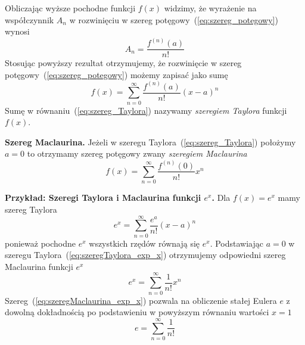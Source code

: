 \documentclass[12pt]{article}
\begin{document}
Obliczając wyższe pochodne funkcji $f(x)$ widzimy, że wyrażenie na
współczynnik $A_{n}$ w rozwinięciu w szereg potęgowy~(\ref{eq:szereg_potegowy})
wynosi
\begin{equation}
A_{n} = \frac{f^{(n)}(a)}{n!}
\end{equation}
Stosując powyższy rezultat otrzymujemy, że 
rozwinięcie w szereg potęgowy~(\ref{eq:szereg_potegowy})
możemy zapisać jako sumę
\begin{equation}
\label{eq:szereg_Taylora}
f(x) 
=
\sum_{n=0}^{\infty} \frac{f^{(n)}(a)}{n!} (x-a)^{n}
\end{equation}
Sumę w równaniu~(\ref{eq:szereg_Taylora}) nazywamy {\em szeregiem Taylora\/} funkcji $f(x)$\@.



{\bf Szereg Maclaurina.\/} Jeżeli w szeregu Taylora~(\ref{eq:szereg_Taylora}) położymy $a = 0$ to otrzymamy 
szereg potęgowy zwany {\em szeregiem Maclaurina\/}
\begin{equation}
\label{eq:szereg_Maclaurina}
f(x) 
=
\sum_{n=0}^{\infty} \frac{f^{(n)}(0)}{n!} x^{n}
\end{equation}


{\bf Przykład: Szeregi Taylora i Maclaurina funkcji $e^{x}$.\/}
Dla $f(x) = e^{x}$ mamy szereg Taylora
\begin{equation}
\label{eq:szeregTaylora_exp_x}
e^{x} = \sum_{n=0}^{\infty} \frac{e^{a}}{n!} (x-a)^{n}
\end{equation}
ponieważ pochodne $e^{x}$ wszystkich rzędów równają się $e^{x}$\@. 
Podstawiając $a = 0$ w szeregu Taylora~(\ref{eq:szeregTaylora_exp_x})
otrzymujemy odpowiedni szereg Maclaurina funkcji $e^{x}$
\begin{equation}
\label{eq:szeregMaclaurina_exp_x}
e^{x} = \sum_{n=0}^{\infty} \frac{1}{n!} x^{n}
\end{equation}
Szereg~(\ref{eq:szeregMaclaurina_exp_x})
pozwala na obliczenie stałej Eulera $e$ z dowolną dokładnością
po podstawieniu w powyższym równaniu wartości $x=1$
\begin{equation}
\label{eq:szeregMaclaurina_exp_1}
e = \sum_{n=0}^{\infty} \frac{1}{n!}
\end{equation}
\end{document}
